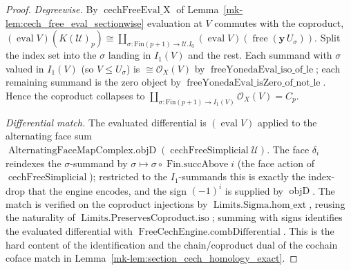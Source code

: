 \begin{proof}
  \emph{Degreewise.} By \(\operatorname{cechFreeEval\_X}\) of
  Lemma~\ref{mk-lem:cech_free_eval_sectionwise} evaluation at \(V\) commutes with the
  coproduct,
  \((\operatorname{eval} V)(K(\mathcal{U})_p) \cong \coprod_{\sigma :
  \mathrm{Fin}(p+1) \to \mathcal{U}.I_0} (\operatorname{eval} V)(\operatorname{free}
  (\mathbf{y}\,U_\sigma))\). Split the index set into the \(\sigma\) landing in
  \(I_1(V)\) and the rest. Each summand with \(\sigma\) valued in \(I_1(V)\) (so
  \(V \leq U_\sigma\)) is \(\cong \mathcal{O}_X(V)\) by
  \(\operatorname{freeYonedaEval\_iso\_of\_le}\); each remaining summand is the zero
  object by \(\operatorname{freeYonedaEval\_isZero\_of\_not\_le}\). Hence the coproduct
  collapses to \(\coprod_{\sigma : \mathrm{Fin}(p+1) \to I_1(V)} \mathcal{O}_X(V) =
  C_p\).

  \emph{Differential match.} The evaluated differential is \((\operatorname{eval} V)\)
  applied to the alternating face sum
  \(\operatorname{AlternatingFaceMapComplex.objD}(\operatorname{cechFreeSimplicial}
  \mathcal{U})\). The face \(\delta_i\) reindexes the \(\sigma\)-summand by
  \(\sigma \mapsto \sigma \circ \operatorname{Fin.succAbove} i\) (the face action of
  \(\operatorname{cechFreeSimplicial}\)); restricted to the
  \(I_1\)-summands this is exactly the index-drop that the engine encodes, and the sign
  \((-1)^i\) is supplied by \(\operatorname{objD}\). The match is verified on the
  coproduct injections by \(\operatorname{Limits.Sigma.hom\_ext}\), reusing the
  naturality of \(\operatorname{Limits.PreservesCoproduct.iso}\); summing with signs
  identifies the evaluated differential with
  \(\operatorname{FreeCechEngine.combDifferential}\). This is the hard content of the
  identification and the chain/coproduct dual of the cochain coface match in
  Lemma~\ref{mk-lem:section_cech_homology_exact}.


\end{proof}
